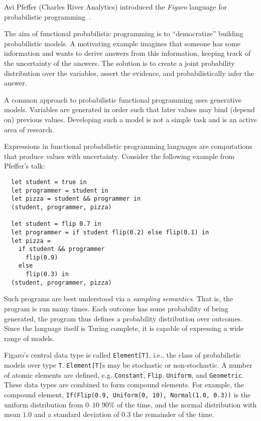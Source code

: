 \documentclass{jfp1}
\begin{document}

Avi Pfeffer (Charles River Analytics) introduced the \textit{Figaro} language
for probabilistic programming~\cite{Pfeffer:2009:Figaro}. 

The aim of functional probabilistic programming is to ``democratize''
building probabilistic models. A motivating example imagines that someone
has some information and wants to derive answers from this information,
keeping track of the uncertainty of the answers. The solution is to create
a joint probability distribution over the variables, assert the evidence,
and probabilistically infer the answer.

A common approach to probabilistic functional programming uses generative
models. Variables are generated in order such that later values may bind
(depend on) previous values. Developing such a model is not a simple task
and is an active area of research.

Expressions in functional probabilistic programming languages are
computations that produce values with uncertainty. Consider the following
example from Pfeffer's talk: 
\begin{verbatim}
  let student = true in
  let programmer = student in
  let pizza = student && programmer in 
  (student, programmer, pizza)

  let student = flip 0.7 in
  let programmer = if student flip(0.2) else flip(0.1) in
  let pizza = 
    if student && programmer 
      flip(0.9) 
    else
      flip(0.3) in
  (student, programmer, pizza)
\end{verbatim}
Such programs are best understood via a \textit{sampling semantics}. That
is, the program is run many times. Each outcome has some probability of
being generated, the program thus defines a probability distribution over
outcomes. Since the language itself is Turing complete, it is capable of
expressing a wide range of models.

Figaro's central data type is called \texttt{Element[T]}, i.e., the
class of probabilistic models over type \texttt{T}. \texttt{Element[T]}s may be
stochastic or non-stochastic. A number of atomic elements are defined,
e.g. \texttt{Constant}, \texttt{Flip}, \texttt{Uniform}, and
\texttt{Geometric}. These data types are combined to form compound
elements. For example, the compound element, \texttt{If(Flip(0.9,
Uniform(0, 10), Normal(1.0, 0.3))} is the uniform distribution from
$0\mbox{--}10$ $90\%$ of the time, and the normal distribution with mean
$1.0$ and a standard deviation of $0.3$ the remainder of the time.
\end{document}

